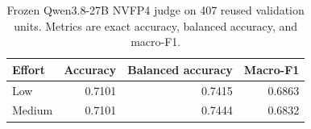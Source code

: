 \begin{table}[ht]
\centering\small
\caption{Frozen Qwen3.8-27B NVFP4 judge on 407 reused validation units. Metrics are exact accuracy, balanced accuracy, and macro-F1.}
\label{tab:judge-effort}
\begin{tabular}{lrrr}
\toprule
Effort & Accuracy & Balanced accuracy & Macro-F1 \\
\midrule
Low & 0.7101 & 0.7415 & 0.6863 \\
Medium & 0.7101 & 0.7444 & 0.6832 \\
\bottomrule
\end{tabular}
\end{table}
